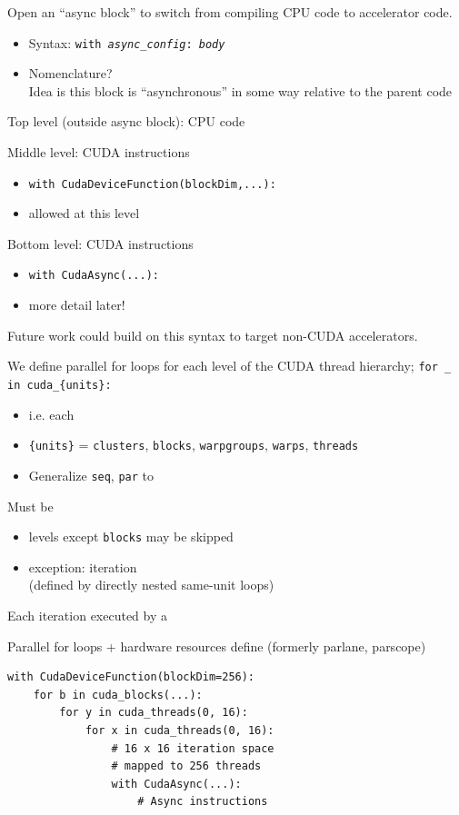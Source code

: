 \begin{minipage}[t]{0.48\textwidth}\fixminipage
Open an ``async block'' to switch from compiling CPU code to accelerator code.
\begin{itemize}
  \item Syntax: \texttt{with \textit{async\_config}: \textit{body}}
  \item Nomenclature?\\Idea is this block is ``asynchronous'' in some way relative to the parent code
\end{itemize}
\vspace{12mm}
Top level (outside async block): CPU code

Middle level:  CUDA instructions
\begin{itemize}
  \item \texttt{with CudaDeviceFunction(blockDim,...):}
  \item {} allowed at this level
\end{itemize}

Bottom level:  CUDA instructions
\begin{itemize}
  \item \texttt{with CudaAsync(...):}
  \item more detail later!
\end{itemize}
\vspace{12mm}
Future work could build on this syntax to target non-CUDA accelerators.
\end{minipage}
\hfill
\begin{minipage}[t]{0.48\textwidth}\fixminipage
We define parallel for loops for each level of the CUDA thread hierarchy;
\texttt{for \_ in cuda\_\{units\}:}
\begin{itemize}
  \item i.e. each 
  \item \texttt{\{units\}} = \texttt{clusters}, \texttt{blocks}, \texttt{warpgroups}, \texttt{warps}, \texttt{threads}
  \item Generalize \texttt{seq}, \texttt{par} to 
\end{itemize}
Must be 
\begin{itemize}
  \item levels except \texttt{blocks} may be skipped
  \item exception:  iteration\\(defined by directly nested same-unit loops)
\end{itemize}
Each iteration executed by a 

Parallel for loops + hardware resources define  (formerly parlane, parscope)

\begin{verbatim}
with CudaDeviceFunction(blockDim=256):
    for b in cuda_blocks(...):
        for y in cuda_threads(0, 16):
            for x in cuda_threads(0, 16):
                # 16 x 16 iteration space
                # mapped to 256 threads
                with CudaAsync(...):
                    # Async instructions
\end{verbatim}
\end{minipage}
